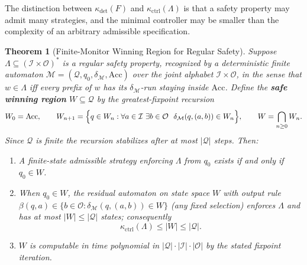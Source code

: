 \documentclass[12pt]{article}
\newtheorem{theorem}{Theorem}[section]
\theoremstyle{definition}
\begin{document}
The distinction between $\kappa_{\det}(F)$ and
$\kappa_{\mathrm{ctrl}}(\Lambda)$ is that a safety property may admit many
strategies, and the minimal controller may be smaller than the complexity of an
arbitrary admissible specification.

\begin{theorem}[Finite-Monitor Winning Region for Regular Safety]
\label{thm:finite-monitor}
Suppose $\Lambda\subseteq(\mathcal I\times\mathcal O)^*$ is a regular safety
property, recognized by a deterministic finite automaton
$\mathcal M=(\mathcal Q,q_0,\delta_{\mathcal M},\mathrm{Acc})$ over the joint
alphabet $\mathcal I\times\mathcal O$, in the sense that $w\in\Lambda$ iff
every prefix of $w$ has its $\delta_{\mathcal M}$-run staying inside
$\mathrm{Acc}$.  Define the \textbf{safe winning region}
$W\subseteq\mathcal Q$ by the greatest-fixpoint recursion
\[
W_0=\mathrm{Acc},
\qquad
W_{n+1}
=
\Bigl\{
q\in W_n:\forall a\in\mathcal I\ \exists b\in\mathcal O\ \
\delta_{\mathcal M}(q,(a,b))\in W_n
\Bigr\},
\qquad
W=\bigcap_{n\ge0}W_n.
\]
Since $\mathcal Q$ is finite the recursion stabilizes after at most
$|\mathcal Q|$ steps.  Then:
\begin{enumerate}[label=(\roman*)]
\item A finite-state admissible strategy enforcing $\Lambda$ from $q_0$
exists if and only if $q_0\in W$.
\item When $q_0\in W$, the residual automaton on state space $W$ with output
rule $\beta(q,a)\in\{b\in\mathcal O:\delta_{\mathcal M}(q,(a,b))\in W\}$ (any
fixed selection) enforces $\Lambda$ and has at most $|W|\le|\mathcal Q|$
states; consequently
\[
\kappa_{\mathrm{ctrl}}(\Lambda)\le|W|\le|\mathcal Q|.
\]
\item $W$ is computable in time polynomial in
$|\mathcal Q|\cdot|\mathcal I|\cdot|\mathcal O|$ by the stated fixpoint
iteration.
\end{enumerate}
\end{theorem}
\end{document}
